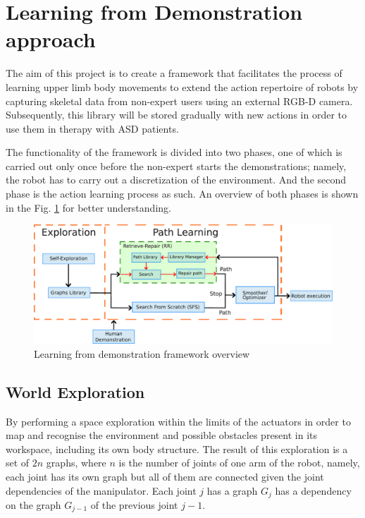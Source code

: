 \documentclass[thesis]{mas_proposal}
\begin{document}
\section{Learning from Demonstration approach}

The aim of this project is to create a framework that facilitates the process of learning upper limb body movements to extend the action repertoire of robots by capturing skeletal data from non-expert users using an external RGB-D camera. Subsequently, this library will be stored gradually with new actions in order to use them in therapy with ASD patients.

The functionality of the framework is divided into two phases, one of which is carried out only once before the non-expert starts the demonstrations; namely, the robot has to carry out a discretization of the environment. And the second phase is the action learning process as such. An overview of both phases is shown in the Fig. \ref{fig:framework_overview} for better understanding.


\begin{figure}[h!]
	\includegraphics[width=\textwidth]{images/framework_overview.pdf}
	\caption{Learning from demonstration framework overview}
	\label{fig:framework_overview}
\end{figure}


\subsection{World Exploration}

By performing a space exploration within the limits of the actuators in order to map and recognise the environment and possible obstacles present in its workspace, including its own body structure. The result of this exploration is a set of $2n$ graphs, where $n$ is the number of joints of one arm of the robot, namely, each joint has its own graph but all of them are connected given the joint dependencies of the manipulator. Each joint $j$ has a graph $G_j$ has a dependency on the graph $G_{j-1}$ of the previous joint $j-1$. 
\end{document}

